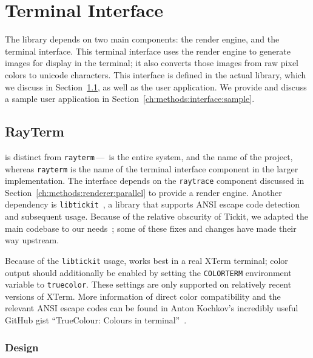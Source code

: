 \section{Terminal Interface} \label{ch:methods:interface}

The \name{} library depends on two main components: the render engine, and the terminal interface.
This terminal interface uses the render engine to generate images for display in the terminal; it also converts those images from raw pixel colors to unicode characters.
This interface is defined in the actual library, which we discuss in Section~\ref{ch:methods:interface:rayterm}, as well as the user application.
We provide and discuss a sample user application in Section~\ref{ch:methods:interface:sample}.

\subsection{RayTerm} \label{ch:methods:interface:rayterm}

 \name{} is distinct from \texttt{rayterm}\,---\,\name{} is the entire system, and the name of the project, whereas \texttt{rayterm} is the name of the terminal interface component in the larger implementation.
The interface depends on the \texttt{raytrace} component discussed in Section~\ref{ch:methods:renderer:parallel} to provide a render engine.
Another dependency is \texttt{libtickit}~\cite{libtickitLibrary}, a library that supports ANSI escape code detection and subsequent usage.
Because of the relative obscurity of Tickit, we adapted the main codebase to our needs~\cite{libtickitCustom}; some of these fixes and changes have made their way upstream.

Because of the \texttt{libtickit} usage, \name{} works best in a real XTerm terminal; color output should additionally be enabled by setting the \texttt{COLORTERM} environment variable to \texttt{truecolor}.
These settings are only supported on relatively recent versions of XTerm.
More information of direct color compatibility and the relevant ANSI escape codes can be found in Anton Kochkov's incredibly useful GitHub gist ``TrueColour: Colours in terminal''~\cite{kochkov2019colours}.

\subsubsection{Design} \label{ch:methods:interface:tickit:design}

